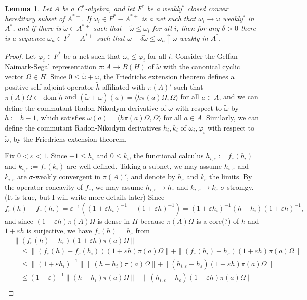 \documentclass[a4paper]{amsart}
\newcommand{\e}{\varepsilon}
\theoremstyle{plain}
\newtheorem{lem}[thm]{Lemma}
\theoremstyle{definition}
\begin{document}
\section{}


\begin{lem}
Let $A$ be a C$^*$-algebra, and let $F^*$ be a weakly$^*$ closed convex hereditary subset of $A^{*+}$.
If $\omega_i\in F^*-A^{*+}$ is a net such that $\omega_i\to\omega$ weakly$^*$ in $A^*$, and if there is $\widetilde\omega\in A^{*+}$ such that $-\widetilde\omega\le\omega_i$ for all $i$, then for any $\delta>0$ there is a sequence $\omega_n\in F^*-A^{*+}$ such that $\omega-\delta\widetilde\omega\le\omega_n\uparrow\omega$ weakly in $A^*$.
\end{lem}
\begin{proof}
Let $\varphi_i\in F^*$ be a net such that $\omega_i\le\varphi_i$ for all $i$.
Consider the Gelfan-Naimark-Segal representation $\pi:A\to B(H)$ of $\widetilde\omega$ with the canonical cyclic vector $\Omega\in H$.
Since $0\le\widetilde\omega+\omega$, the Friedrichs extension theorem defines a positive self-adjoint operator $\widetilde h$ affiliated with $\pi(A)'$ such that $\pi(A)\Omega\subset\operatorname{dom}\widetilde h$ and $(\widetilde\omega+\omega)(a)=\langle\widetilde h\pi(a)\Omega,\Omega\rangle$ for all $a\in A$, and we can define the commutant Radon-Nikodym derivative of $\omega$ with respect to $\widetilde\omega$ by $h:=\widetilde h-1$, which satisfies $\omega(a)=\langle h\pi(a)\Omega,\Omega\rangle$ for all $a\in A$.
Similarly, we can define the commutant Radon-Nikodym derivatives $h_i,k_i$ of $\omega_i,\varphi_i$ with respect to $\widetilde\omega$, by the Friedrichs extension theorem.

Fix $0<\e<1$.
Since $-1\le h_i$ and $0\le k_i$, the functional calculus $h_{i,\e}:=f_\e(h_i)$ and $k_{i,\e}:=f_\e(k_i)$ are well-defined.
Taking a subnet, we may assume $h_{i,\e}$ and $k_{i,\e}$ are $\sigma$-weakly convergent in $\pi(A)'$, and denote by $h_\e$ and $k_\e$ the limits.
By the operator concavity of $f_\e$, we may assume $h_{i,\e}\to h_\e$ and $k_{i,\e}\to k_\e$ $\sigma$-stronlgy.
(It is true, but I will write more details later)
Since
\[f_\e(h)-f_\e(h_i)=\e^{-1}((1+\e h_i)^{-1}-(1+\e h)^{-1})=(1+\e h_i)^{-1}(h-h_i)(1+\e h)^{-1},\]
and since $(1+\e h)\pi(A)\Omega$ is dense in $H$ because $\pi(A)\Omega$ is a core(?) of $h$ and $1+\e h$ is surjective, we have $f_\e(h)=h_\e$ from
\begin{align*}
&\|(f_\e(h)-h_\e)(1+\e h)\pi(a)\Omega\|\\
&\quad\le\|(f_\e(h)-f_\e(h_i))(1+\e h)\pi(a)\Omega\|
+\|(f_\e(h_i)-h_\e)(1+\e h)\pi(a)\Omega\|\\
&\quad\le\|(1+\e h_i)^{-1}\|\|(h-h_i)\pi(a)\Omega\|
+\|(h_{i,\e}-h_\e)(1+\e h)\pi(a)\Omega\|\\
&\quad\le(1-\e)^{-1}\|(h-h_i)\pi(a)\Omega\|
+\|(h_{i,\e}-h_\e)(1+\e h)\pi(a)\Omega\|\\
\end{align*}


\end{proof}
\end{document}
